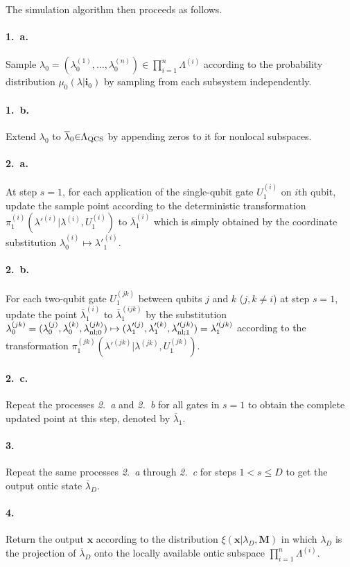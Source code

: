 \documentclass[prl,twocolumn,amsmath,amssymb,nofootinbib]{revtex4-1}
\newcommand\s[1]{_{\rm #1}}
\newcommand\sn[2]{_{{\rm #1}{;}#2}}
\begin{document}
The simulation algorithm then proceeds as follows.
\paragraph*{1.~a.}
Sample $\lambda_0 {=} (\lambda_0^{(1)},\dots,\lambda_0^{(n)}) {\in} \prod_{i=1}^n\Lambda^{(i)}$ according to the probability distribution $\mu_0(\lambda|\mathbf{i}_0)$ by sampling from each subsystem independently.
\paragraph*{1.~b.}
Extend $\lambda_0$ to $\overline{\lambda}_0 {\in} \Lambda\s{QCS}$ by appending zeros to it for nonlocal subspaces.
\paragraph*{2.~a.}
At step $s {=} 1$, for each application of the single-qubit gate $U_1^{(i)}$ on $i$th qubit, update the sample point according to the deterministic transformation $\pi_1^{(i)}(\lambda'^{(i)}|\lambda^{(i)},U_1^{(i)})$ to $\overline{\lambda}_1^{(i)}$ which is simply obtained by the coordinate substitution $\lambda_0^{(i)}\mapsto\lambda'^{(i)}_1$.
\paragraph*{2.~b.}
For each two-qubit gate $U_1^{(jk)}$ between qubits $j$ and $k$ ($j,k {\neq} i$) at step $s{=}1$, update the point $\overline{\lambda}_1^{(i)}$ to $\overline{\lambda}_1^{(ijk)}$ by the substitution 
$\lambda_0^{(jk)}=(\lambda_0^{(j)},\lambda_0^{(k)},\lambda\sn{nl}{0}^{(jk)})\mapsto (\lambda_1'^{(j)},\lambda_1'^{(k)},\lambda\sn{nl}{1}'^{(jk)})=\lambda'^{(jk)}_1$ 
according to the transformation $\pi_1^{(jk)}(\lambda'^{(jk)}|\lambda^{(jk)},U_1^{(jk)})$.
\paragraph*{2.~c.}
Repeat the processes \textit{2.~a} and \textit{2.~b} for all gates in $s{=}1$ to obtain the complete updated point at this step, denoted by $\overline{\lambda}_1$.
\paragraph*{3.}
Repeat the same processes \textit{2.~a} through \textit{2.~c} for steps $1{<}s{\leqslant} D$ to get the output ontic state $\overline{\lambda}_D$.
\paragraph*{4.}
Return the output $\mathbf{x}$ according to the distribution $\xi(\mathbf{x}|\lambda_D,\mathbf{M})$ in which $\lambda_D$ is the projection of $\overline{\lambda}_D$ onto the locally available ontic subspace $\prod_{i=1}^n\Lambda^{(i)}$.
\end{document}
